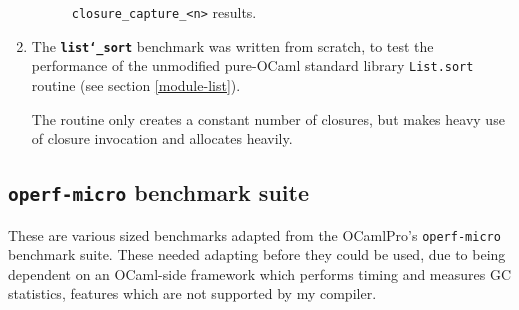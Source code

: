 \documentclass[12pt,a4paper,twoside,openright]{report}
\begin{document}
\begin{enumerate}
\begin{figure}[h]
  \caption{\lstinline!closure_capture_<n>! results.}\label{graph-closure-capture}
\end{figure}

  \item

  The \textbf{\texttt{list\char`_sort}} benchmark was written from scratch, to test the
  performance of the unmodified pure-OCaml standard library \lstinline!List.sort!
  routine (see section \ref{module-list}).

  The routine only creates a constant number of closures, but makes heavy use of
  closure invocation and allocates heavily.
\end{enumerate}

\subsection{\texttt{operf-micro} benchmark suite}
These are various sized benchmarks adapted from the OCamlPro's
      \lstinline!operf-micro! benchmark suite. These needed adapting before
      they could be used, due to being dependent on an OCaml-side framework
      which performs timing and measures GC statistics, features which are not
      supported by my compiler.
\end{document}
